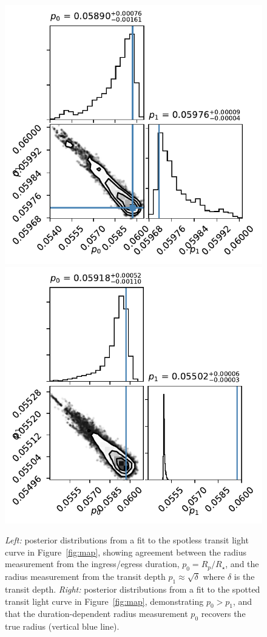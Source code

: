 \begin{figure}%
    \centering
    \includegraphics[scale=0.75]{robin/corner_quad_spotless.pdf}
    \includegraphics[scale=0.75]{robin/corner_quad.pdf}
    \caption{\textsl{Left:} posterior distributions from a fit to the spotless transit light curve in Figure~\ref{fig:map}, showing agreement between the radius measurement from the ingress/egress duration, $p_0 = R_p/R_\star$, and the radius measurement from the transit depth $p_1 \approx \sqrt{\delta}$ where $\delta$ is the transit depth. \textsl{Right:} posterior distributions from a fit to the spotted transit light curve in Figure~\ref{fig:map}, demonstrating $p_0 > p_1$, and that the duration-dependent radius measurement $p_0$ recovers the true radius (vertical blue line).}
    \label{fig:corners}
\end{figure}

